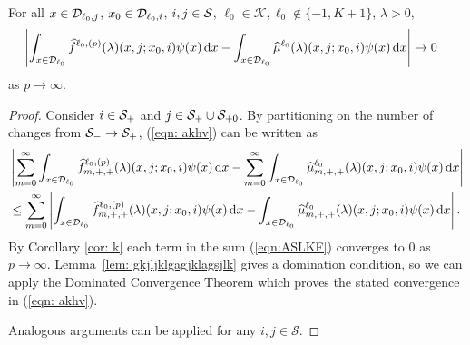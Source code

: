 \begin{lem} \label{lem:vn4}
	For all \(x\in\mathcal{D}_{\ell_0,j}\), \(x_0\in\mathcal{D}_{\ell_0,i}\), \(i,j\in\mathcal{S}\), \(\ell_0\in\mathcal K, \ell_0\notin\{-1,K+1\}\), \(\lambda > 0\),  
	\begin{align}
		&\left|\int_{x\in\mathcal{D}_{\ell_0}}\widehat f^{\ell_0,(p)}(\lambda)(x,j;x_0,i)\psi(x) \, \mathrm{d} x - \int_{x\in\mathcal{D}_{\ell_0}}\widehat \mu^{\ell_0}(\lambda)( x,j; x_0,i)\psi(x) \, \mathrm{d} x\right|\to 0  \label{eqn: akhv}
	\end{align}
	as \(p\to\infty\). 
\end{lem}
\begin{proof}
	 
	
	Consider \(i\in\mathcal{S}_+\) and \(j\in\mathcal{S}_+\cup\mathcal{S}_{+0}\). By partitioning on the number of changes from \(\mathcal{S}_-\to\mathcal{S}_+\), (\ref{eqn: akhv}) can be written as
	\begin{align}
		&\left|\sum_{m=0}^\infty \int_{x\in\mathcal{D}_{\ell_0}}\widehat f^{\ell_0,(p)}_{m,+,+}(\lambda)(x,j;x_0,i)\psi(x)\, \mathrm{d} x
		-
		\sum_{m=0}^\infty \int_{x\in\mathcal{D}_{\ell_0}} \widehat \mu^{\ell_0}_{m,+,+}(\lambda)(x,j;x_0,i)\psi(x)\, \mathrm{d} x\right| \nonumber
		\\&\leq \sum_{m=0}^\infty \left| \int_{x\in\mathcal{D}_{\ell_0}}\widehat f^{\ell_0,(p)}_{m,+,+}(\lambda)(x,j;x_0,i)\psi(x)\, \mathrm{d} x
		-
		\int_{x\in\mathcal{D}_{\ell_0}} \widehat \mu^{\ell_0}_{m,+,+}(\lambda)(x,j;x_0,i)\psi(x)\, \mathrm{d} x\right|. \label{eqn:ASLKF}
        \end{align}
        By Corollary \ref{cor: k} each term in the sum (\ref{eqn:ASLKF}) converges to \(0\) as \(p\to\infty\). Lemma~\ref{lem: gkjljklgagjklagsjlk} gives a domination condition, so we can apply the Dominated Convergence Theorem which proves the stated convergence in (\ref{eqn: akhv}).
        
        Analogous arguments can be applied for any \(i,j\in\mathcal S\). 
\end{proof}


